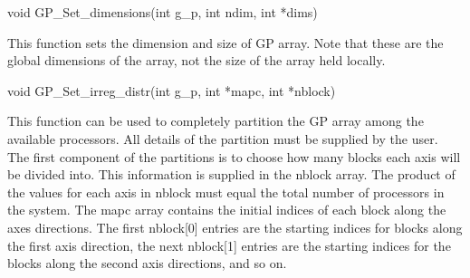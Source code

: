 \documentclass[12pt]{article}
\begin{document}


\begin{capi}
\begin{ccode}
void GP\_Set\_dimensions(int g\_p, int ndim, int *dims)
\begin{funcargs}
\end{funcargs}
\end{ccode}
\end{capi}

\local

\begin{desc}

This function sets the dimension and size of GP array. Note that these are the
global dimensions of the array, not the size of the array held locally.

\end{desc}



\begin{capi}
\begin{ccode}
void GP\_Set\_irreg\_distr(int g\_p, int *mapc, int *nblock)
\begin{funcargs}
\end{funcargs}
\end{ccode}
\end{capi}

\local

\begin{desc}

This function can be used to completely partition the GP array among the
available processors. All details of the partition must be supplied by the user.
The first component of the partitions is to choose how many blocks each axis
will be divided into. This information is supplied in the nblock array. The
product of the values for each axis in nblock must equal the total number of
processors in the system. The mapc array contains the initial indices of each
block along the axes directions. The first nblock[0] entries are the starting
indices for blocks along the first axis direction, the next nblock[1] entries
are the starting indices for the blocks along the second axis directions, and so
on.

\end{desc}
\end{document}
